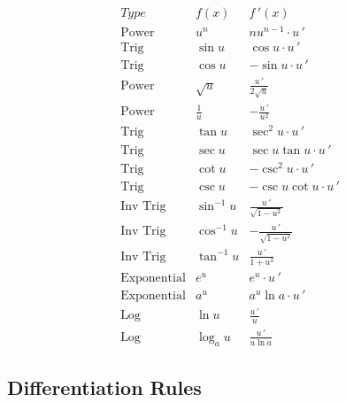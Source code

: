 \documentclass[handout]{ximera}
\begin{document}
\begin{center}
\[
\begin{array}{c|c|c}
		Type & f(x) & f\,'(x)  \\
		\hline
		\text{Power} & u^n & nu^{n-1}\cdot u\,'  \\[8pt]
		\hline
		\text{Trig} & \sin u & \cos u \cdot u\,' \\[8pt]
		\text{Trig} & \cos u & -\sin u\cdot u\,'  \\[8pt]
		\hline
		\text{Power} & \sqrt{u} & \displaystyle \frac{u\,' }{2\sqrt {u}}\\[8pt]
		\text{Power} & \displaystyle \frac{1}{u} & -\displaystyle \frac{u\,' }{u^2}\\[8pt]
	  \hline
	  \text{Trig} & \tan u & \sec^2 u \cdot u\,'  \\[8pt]
		\text{Trig} & \sec u & \sec u\tan u \cdot u\,'  \\[8pt]
		\hline
		\text{Trig} & \cot u & -\csc^2 u \cdot u\,'   \\[8pt]
		\text{Trig} & \csc u & -\csc u\cot u \cdot u\,'   \\[8pt]
		\hline
		\text{Inv Trig} & \sin^{-1} u &   \displaystyle \frac{u\,' }{\sqrt{1-u^2}}  \\[8pt]
		\text{Inv Trig} & \cos^{-1} u &   \displaystyle -\frac{u\,' }{\sqrt{1-u^2}}\\[8pt]
		\text{Inv Trig} & \tan^{-1} u &   \displaystyle \frac{u\,' }{1+u^2} \\[8pt]
		\hline
		\text{Exponential} & e^{u} & e^{u} \cdot u\,' \\[8pt]
		\text{Exponential} & a^{u} & a^{u}\ln a \cdot u\,' \\[8pt]
		\hline
		\text{Log} & \ln u &   \displaystyle \frac{u\,'}{u} \\[8pt]
		\text{Log} & \log_a u &   \displaystyle \frac{u\,'}{u\ln a}
	\end{array}
    \]
\end{center}



\subsection{Differentiation Rules}
\end{document}
